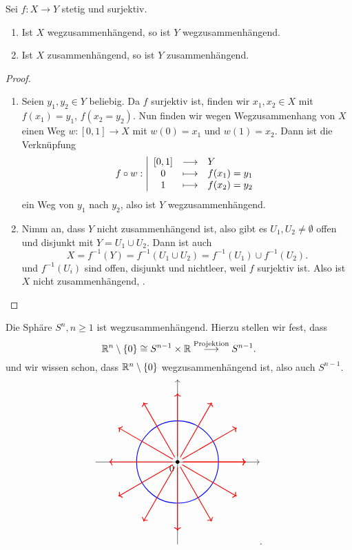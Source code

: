 \begin{lemma}\label{lm:bilder-von-zusammenhängenden-räumen-sind-zusammenhängend}
    Sei $f: X \to  Y$ stetig und surjektiv.
    \begin{enumerate}[1)]
        \item Ist $X$ wegzusammenhängend, so ist  $Y$ wegzusammenhängend.
        \item Ist  $X$ zusammenhängend, so ist $Y$ zusammenhängend.
    \end{enumerate}
\end{lemma}
\begin{proof}
    \begin{enumerate}[1)]
        \item Seien $y_1,y_2\in Y$ beliebig. Da $f$ surjektiv ist, finden wir  $x_1,x_2\in X$ mit $f(x_1) = y_1$, $f(x_2=y_2)$. Nun finden wir wegen Wegzusammenhang von $X$ einen Weg  $w: [0,1] \to X$ mit $w(0) = x_1$ und $w(1) = x_2$. Dann ist die Verknüpfung
                \begin{equation*}
                f \circ  w: \left| \begin{array}{c c l} 
                    [0,1] & \longrightarrow & Y \\
                    0 & \longmapsto &  f(x_1) = y_1 \\
                    1 & \longmapsto & f(x_2) = y_2
                \end{array} \right.
            \end{equation*}
            ein Weg von $y_1$ nach $y_2$, also ist $Y$ wegzusammenhängend.
        \item Nimm an, dass $Y$ nicht zusammenhängend ist, also gibt es  $U_1,U_2\neq \emptyset$ offen und disjunkt mit $Y = U_1 \cup U_2$. Dann ist auch
            \[
                X = f^{-1}(Y) = f^{-1}(U_1\cup U_2) = f^{-1}(U_1) \cup f^{-1}(U_2)
            .\] 
            und $f^{-1}(U_i)$ sind offen, disjunkt und nichtleer, weil $f$ surjektiv ist. Also ist $X$ nicht zusammenhängend, \contra.
    \end{enumerate}
\end{proof}
\begin{example}
    Die Sphäre $S^n, n\geq 1$ ist wegzusammenhängend. Hierzu stellen wir fest, dass
    \[
        \mathbb{R}^n \setminus \left \{0\right\}  \cong S^{n-1}\times \mathbb{R} \stackrel{\text{Projektion}}{\longrightarrow} S^{n-1}
    .\] 
und wir wissen schon, dass $\mathbb{R}^n \setminus \left \{0\right\}$ wegzusammenhängend ist, also auch $S^{n-1}$.
\[
\begin{tikzpicture}
    \draw[->] (-3,0) -- (3,0);
    \draw[->] (0,-3) -- (0,3) node[midway, anchor = north east] {$0$};
    \fill (0,0) circle (2pt);
    \draw[blue, thick] (0,0) circle (1.5);
    \foreach \x in {0,...,12} {
        \draw[red,thick,->] (\x*30:0.2) -- (\x*30:2.5);
    }
\end{tikzpicture}
.\] 
\end{example}

